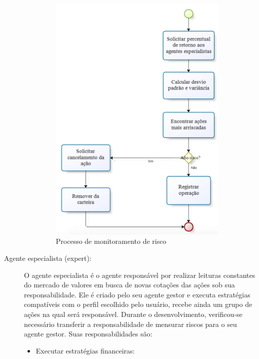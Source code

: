 \begin{description}
\begin{itemize}
\begin{figure}[H]
\centering
\label{f24}
\includegraphics[width=0.9\textwidth]{figuras/f15}
\caption{Processo de monitoramento de risco}
\end{figure}
\FloatBarrier

\end{itemize}

\item[Agente especialista (expert):]
O agente especialista é o agente responsável por realizar leituras constantes do mercado de valores em busca de novas cotações das ações sob sua responsabilidade. Ele é criado pelo seu agente gestor e executa estratégias compatíveis com o perfil escolhido pelo usuário, recebe ainda um grupo de ações na qual será responsável. Durante o desenvolvimento, verificou-se necessário transferir a responsabilidade de mensurar riscos para o seu agente gestor. Suas responsabilidades são:

\begin{itemize}
\item Executar estratégias financeiras:\newline


\end{itemize}
\end{description}

